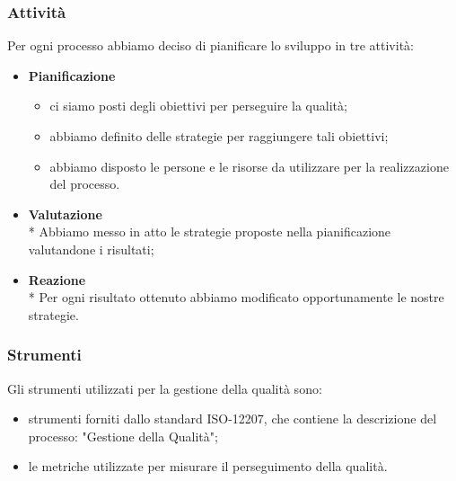 \subsubsection{Attività}
Per ogni processo abbiamo deciso di pianificare lo sviluppo in tre attività:
\begin{itemize}
	\item \textbf{Pianificazione}
		\begin{itemize}
			\item ci siamo posti degli obiettivi per perseguire la qualità;
			\item abbiamo definito delle strategie per raggiungere tali obiettivi;
			\item abbiamo disposto le persone e le risorse da utilizzare per la realizzazione del processo.
		\end{itemize}
	\item \textbf{Valutazione} \\*
		Abbiamo messo in atto le strategie proposte nella pianificazione valutandone i risultati;
	\item \textbf{Reazione} \\*
		Per ogni risultato ottenuto abbiamo modificato opportunamente le nostre strategie.
\end{itemize}
\subsubsection{Strumenti}
Gli strumenti utilizzati per la gestione della qualità sono:
\begin{itemize}
	\item strumenti forniti dallo standard ISO-12207, che contiene la descrizione del processo: "Gestione della Qualità";
	\item le metriche utilizzate per misurare il perseguimento della qualità.
\end{itemize}
